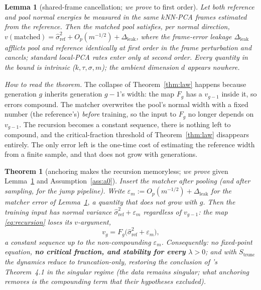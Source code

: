 \documentclass[11pt]{article}
\newtheorem{theorem}{Theorem}
\newtheorem{lemma}{Lemma}
\theoremstyle{remark}
\newcommand{\eps}{\varepsilon}
\begin{document}
\begin{lemma}[shared-frame cancellation; \emph{we prove} to first order]\label{lem:frames}
Let both reference and pool normal energies be measured in the same $k$NN-PCA frames
estimated from the reference. Then the matched pool satisfies, per normal direction,
$v(\mathrm{matched})=\hat\sigma^2_{\mathrm{ref}}+O_p(m^{-1/2})+\Delta_{\mathrm{leak}}$,
where the frame-error leakage $\Delta_{\mathrm{leak}}$ afflicts pool and reference
\emph{identically} at first order in the frame perturbation and cancels; standard
local-PCA rates \citep{aamari2019nonasymptotic,singer2012vector} enter only at second
order. Every quantity in the bound is intrinsic ($k,\tau,\sigma,m$); the ambient
dimension $d$ appears nowhere.
\end{lemma}

\emph{How to read the theorem.} The collapse of Theorem~\ref{thm:law} happens because
generation $g$ inherits generation $g\!-\!1$'s width: the map $F_g$ has a $v_{g-1}$ inside
it, so errors compound. The matcher overwrites the pool's normal width with a fixed number
(the reference's) \emph{before} training, so the input to $F_g$ no longer depends on
$v_{g-1}$. The recursion becomes a constant sequence, there is nothing left to compound,
and the critical-fraction threshold of Theorem~\ref{thm:law} disappears entirely. The only
error left is the one-time cost of estimating the reference width from a finite sample, and
that does not grow with generations.

\begin{theorem}[anchoring makes the recursion memoryless; \emph{we prove} given
Lemma~\ref{lem:frames} and Assumption~\ref{ass:a0}]\label{thm:fix}
Insert the matcher after pooling (and after sampling, for the jump pipeline). Write
$\eps_m:=O_p(m^{-1/2})+\Delta_{\mathrm{leak}}$ for the matcher error of
Lemma~\ref{lem:frames}, a quantity that does not grow with $g$. Then the
training input has normal variance $\hat\sigma^2_{\mathrm{ref}}+\eps_m$
\emph{regardless of $v_{g-1}$}: the map \eqref{eq:recursion} loses its $v$-argument,
\[
v_g=F_g\big(\hat\sigma^2_{\mathrm{ref}}+\eps_m\big),
\]
a constant sequence up to the non-compounding $\eps_m$. Consequently: no fixed-point
equation, \textbf{no critical fraction, and stability for every $\lambda>0$}; and with
$S_{\mathrm{trunc}}$ the dynamics reduce to truncation-only, restoring the
\emph{conclusion} of \citet{khelifa2026recursive}'s Theorem~4.1 in the singular regime
(the data remains singular; what anchoring removes is the compounding term that their
hypotheses excluded).
\end{theorem}
\end{document}
